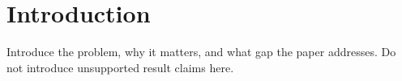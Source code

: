 \section{Introduction}

Introduce the problem, why it matters, and what gap the paper addresses. Do not introduce unsupported result claims here.
